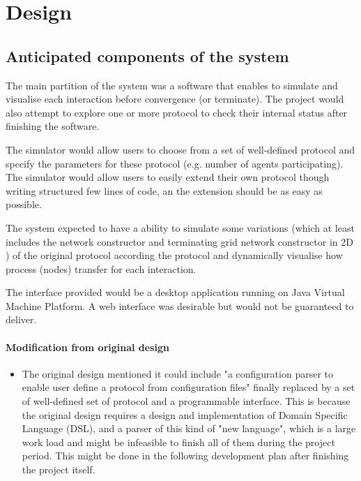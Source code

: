 \section{Design}
\subsection{Anticipated components of the system}
\par\noindent
The main partition of the system was a software that enables to simulate
and visualise each interaction before convergence (or terminate). The project
would also attempt to explore one or more protocol to check their internal
status after finishing the software.

\par\noindent
The simulator would allow users to choose from a set of well-defined protocol and
specify the parameters for these protocol (e.g. number of agents participating).
The simulator would allow users to easily extend their own protocol though writing
structured few lines of code, an the extension should be as easy as possible.

\par\noindent
The system expected to have a ability to simulate some variations (which at
least includes the network constructor \cite{MS16a} and terminating grid network constructor in 2D \cite{Mi17})
of the original protocol according the protocol and dynamically visualise how process (nodes) transfer for each interaction.

\par\noindent
The interface provided would be a desktop application running on Java Virtual Machine Platform.
A web interface was desirable but would not be guaranteed to deliver.

\paragraph{Modification from original design}
\begin{itemize}
  \item The original design mentioned it could include "a configuration parser to
  enable user define a protocol from configuration files" finally replaced by a set of
  well-defined set of protocol and a programmable interface. This is because the
  original design requires a design and implementation of Domain Specific Language (DSL),
  and a parser of this kind of "new language", which is a large work load and might be
  infeasible to finish all of them
  during the project period. This might be done in the following development plan
  after finishing the project itself.
\end{itemize}


